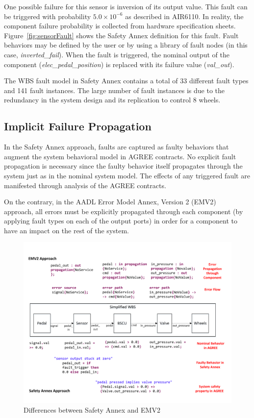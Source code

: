 One possible failure for this sensor is inversion of its output value. This fault can be triggered with probability $5.0\times 10^{-6}$ as described in AIR6110. In reality, the component failure probability is collected from hardware specification sheets.  Figure~\ref{fig:sensorFault} shows the Safety Annex definition for this fault. Fault behaviors may be defined by the user or by using a library of fault nodes (in this case, \textit{inverted\_fail}).  When the fault is triggered, the nominal output of the component (\textit{elec\_pedal\_position}) is replaced with its failure value (\textit{val\_out}). 

The WBS fault model in Safety Annex contains a total of 33 different fault types and 141 fault instances. The large number of fault instances is due to the redundancy in the system design and its replication to control 8 wheels.

\subsection{Implicit Failure Propagation}
In the Safety Annex approach, faults are captured as faulty behaviors that augment the system behavioral model in AGREE contracts. No explicit fault propagation is necessary since the faulty behavior itself propagates through the system just as in the nominal system model. The effects of any triggered fault are manifested through analysis of the AGREE contracts. 

On the contrary, in the AADL Error Model Annex, Version 2 (EMV2)~\cite{EMV2} approach, all errors must be explicitly propagated through each component (by applying fault types on each of the output ports) in order for a component to have an impact on the rest of the system. 

\begin{figure}[t]
	\vspace{-0.19in}
	\centering
	\includegraphics[trim=0 9 0 5,clip,width=\textwidth]{images/Comparison_with_EMV2.pdf}
	\caption{Differences between Safety Annex and EMV2}
	\label{fig:comparison_with_EMV2}
\end{figure} 


